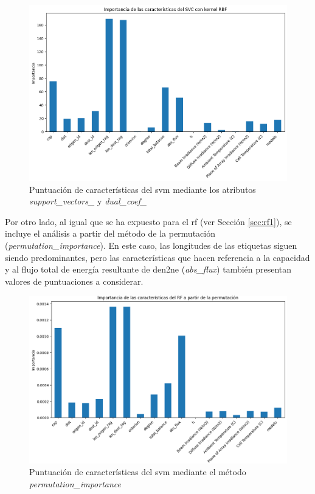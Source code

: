\vspace{3mm}

\begin{figure}[H]
    \centering
    \includegraphics[width=1\textwidth]{img/desarrollo/svm/importance3.png}
    \caption{Puntuación de características del \acrshort{svm} mediante los atributos \textit{support\_vectors\_} y \textit{dual\_coef\_}}
    \label{fig:imp3}
\end{figure}

\pagebreak

Por otro lado, al igual que se ha expuesto para el \gls{rf} (ver Sección \ref{sec:rf1}), se incluye el análisis a partir del método de la permutación (\textit{permutation\_importance}). En este caso, las longitudes de las etiquetas siguen siendo predominantes, pero las características que hacen referencia a la capacidad y al flujo total de energía resultante de \gls{den2ne} (\textit{abs\_flux}) también presentan valores de puntuaciones a considerar.

\begin{figure}[H]
    \centering
    \includegraphics[width=1\textwidth]{img/desarrollo/svm/importance4.png}
    \caption{Puntuación de características del \acrshort{svm} mediante el método \textit{permutation\_importance}}
    \label{fig:imp4}
\end{figure}

